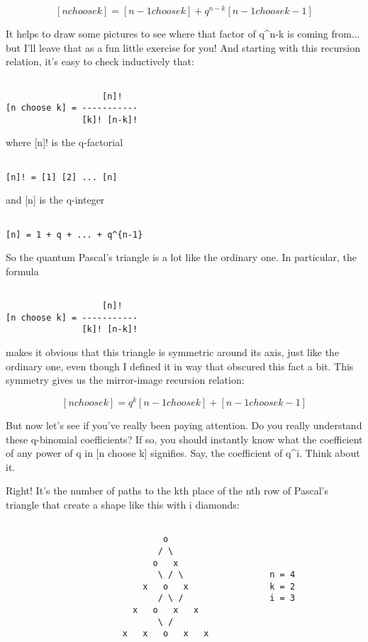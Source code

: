 $$

[n choose k]  =  [n-1 choose k]  +  q^{n-k} [n-1 choose k-1]
$$
    
It helps to draw some pictures to see where that factor of q^{n-k} is
coming from... but I'll leave that as a fun little exercise for you!   
And starting with this recursion relation, it's easy to check inductively 
that:


\begin{verbatim}

                   [n]!
[n choose k] = -----------
               [k]! [n-k]!
\end{verbatim}
    
where [n]! is the q-factorial


\begin{verbatim}

[n]! = [1] [2] ... [n]
\end{verbatim}
    
and [n] is the q-integer


\begin{verbatim}

[n] = 1 + q + ... + q^{n-1}
\end{verbatim}
    
So the quantum Pascal's triangle is a lot like the ordinary one.  
In particular, the formula 


\begin{verbatim}

                   [n]!
[n choose k] = -----------
               [k]! [n-k]!
\end{verbatim}
    
makes it obvious that this triangle is symmetric around its axis, just
like the ordinary one, even though I defined it in way that obscured
this fact a bit.  This symmetry gives us the mirror-image recursion
relation:


$$

[n choose k]  =  q^{k} [n-1 choose k]  +  [n-1 choose k-1]
$$
    
But now let's see if you've really been paying attention.  Do you really
understand these q-binomial coefficients?  If so, you should instantly
know what the coefficient of any power of q in [n choose k] signifies. 
Say, the coefficient of q^{i}.  Think about it.

Right!  It's the number of paths to the kth place of the nth row
of Pascal's triangle that create a shape like this with i diamonds:


\begin{verbatim}

                               o
                              / \
                             o   x
                              \ / \                 n = 4
                           x   o   x                k = 2
                              / \ /                 i = 3
                         x   o   x   x
                              \ /
                       x   x   o   x   x
\end{verbatim}
    
